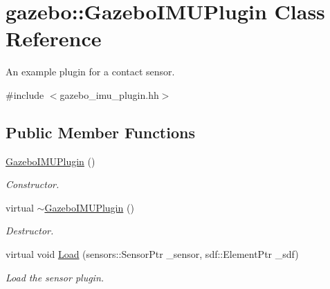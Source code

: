 \hypertarget{classgazebo_1_1GazeboIMUPlugin}{\section{gazebo\-:\-:\-Gazebo\-I\-M\-U\-Plugin \-Class \-Reference}
\label{classgazebo_1_1GazeboIMUPlugin}
}


\-An example plugin for a contact sensor.  




{\ttfamily \#include $<$gazebo\-\_\-imu\-\_\-plugin.\-hh$>$}

\subsection*{\-Public \-Member \-Functions}
\begin{DoxyCompactItemize}
\item 
\hypertarget{classgazebo_1_1GazeboIMUPlugin_a825a685d2954b2f21216d806d1d10a46}{\hyperlink{classgazebo_1_1GazeboIMUPlugin_a825a685d2954b2f21216d806d1d10a46}{\-Gazebo\-I\-M\-U\-Plugin} ()}\label{classgazebo_1_1GazeboIMUPlugin_a825a685d2954b2f21216d806d1d10a46}

\begin{DoxyCompactList}\small\item\em \-Constructor. \end{DoxyCompactList}\item 
\hypertarget{classgazebo_1_1GazeboIMUPlugin_a88ed20ee82baad7195e1529588685cb5}{virtual \hyperlink{classgazebo_1_1GazeboIMUPlugin_a88ed20ee82baad7195e1529588685cb5}{$\sim$\-Gazebo\-I\-M\-U\-Plugin} ()}\label{classgazebo_1_1GazeboIMUPlugin_a88ed20ee82baad7195e1529588685cb5}

\begin{DoxyCompactList}\small\item\em \-Destructor. \end{DoxyCompactList}\item 
virtual void \hyperlink{classgazebo_1_1GazeboIMUPlugin_af793b9782ec5bd05035a191626c37564}{\-Load} (sensors\-::\-Sensor\-Ptr \-\_\-sensor, sdf\-::\-Element\-Ptr \-\_\-sdf)
\begin{DoxyCompactList}\small\item\em \-Load the sensor plugin. \end{DoxyCompactList}\end{DoxyCompactItemize}
